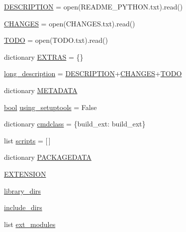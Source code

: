 \begin{DoxyCompactItemize}
\item 
\hyperlink{namespacesetup_aacf82187b02622ad73bf3c715a937aef}{D\+E\+S\+C\+R\+I\+P\+T\+I\+ON} = open(\textquotesingle{}R\+E\+A\+D\+M\+E\+\_\+\+P\+Y\+T\+H\+O\+N.\+txt\textquotesingle{}).read()
\item 
\hyperlink{namespacesetup_a0b77f3f30942b5c300c99a938a22f0e4}{C\+H\+A\+N\+G\+ES} = open(\textquotesingle{}C\+H\+A\+N\+G\+E\+S.\+txt\textquotesingle{}).read()
\item 
\hyperlink{namespacesetup_a96e41601b0756d4ffd1ab86d8590cfb2}{T\+O\+DO} = open(\textquotesingle{}T\+O\+D\+O.\+txt\textquotesingle{}).read()
\item 
dictionary \hyperlink{namespacesetup_aee28626b6df88b72de8654427de30a77}{E\+X\+T\+R\+AS} = \{\}
\item 
\hyperlink{namespacesetup_a4cda9dbfb952875376a0749fe08a5bde}{long\+\_\+description} = \hyperlink{namespacesetup_aacf82187b02622ad73bf3c715a937aef}{D\+E\+S\+C\+R\+I\+P\+T\+I\+ON}+\hyperlink{namespacesetup_a0b77f3f30942b5c300c99a938a22f0e4}{C\+H\+A\+N\+G\+ES}+\hyperlink{namespacesetup_a96e41601b0756d4ffd1ab86d8590cfb2}{T\+O\+DO}
\item 
dictionary \hyperlink{namespacesetup_ae910ca5aee952094e9be80bfbe5b8d63}{M\+E\+T\+A\+D\+A\+TA}
\item 
\hyperlink{mac_2config_2i386_2lib-src_2libsoxr_2soxr-config_8h_abb452686968e48b67397da5f97445f5b}{bool} \hyperlink{namespacesetup_a04f025c3b16747ab994288015f985f2f}{using\+\_\+setuptools} = False
\item 
dictionary \hyperlink{namespacesetup_ad23e0b4fd9e5e6f20f8313d75832d1e2}{cmdclass} = \{\textquotesingle{}build\+\_\+ext\textquotesingle{}\+: build\+\_\+ext\}
\item 
list \hyperlink{namespacesetup_ac1f45f8d37050b278bf63c812b1130dd}{scripts} = \mbox{[}$\,$\mbox{]}
\item 
dictionary \hyperlink{namespacesetup_a2ffaed6c0e5f1ac12a3dcac3a3264576}{P\+A\+C\+K\+A\+G\+E\+D\+A\+TA}
\item 
\hyperlink{namespacesetup_a6b7740a5f684fdfac2d9e8625a2c9a29}{E\+X\+T\+E\+N\+S\+I\+ON}
\item 
\hyperlink{namespacesetup_a1f8901799e0c49c469161a6a4e79e759}{library\+\_\+dirs}
\item 
\hyperlink{namespacesetup_a52eaf4a217a97fb82180c1b16165017e}{include\+\_\+dirs}
\item 
list \hyperlink{namespacesetup_a75e1b9b094c785fb1fabf9342f43ee73}{ext\+\_\+modules}
\end{DoxyCompactItemize}


